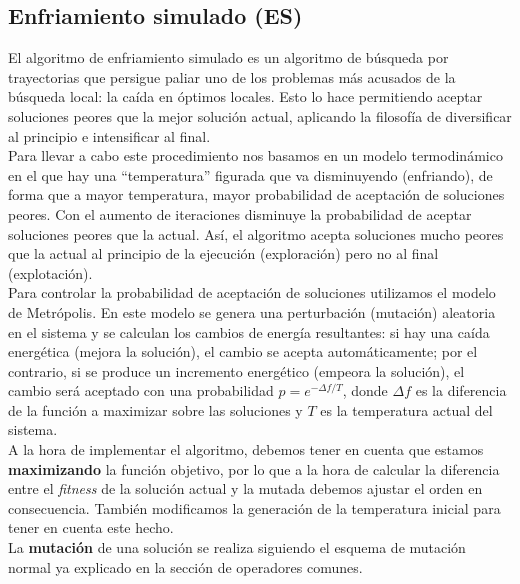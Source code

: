 \documentclass[12pt]{article}
\begin{document}
\subsection*{Enfriamiento simulado (ES)}
\label{es}

El algoritmo de enfriamiento simulado es un algoritmo de búsqueda por trayectorias que persigue paliar uno de los problemas más acusados de la búsqueda local: la caída en óptimos locales. Esto lo hace permitiendo aceptar soluciones peores que la mejor solución actual, aplicando la filosofía de diversificar al principio e intensificar al final.\\

Para llevar a cabo este procedimiento nos basamos en un modelo termodinámico en el que hay una ``temperatura'' figurada que va disminuyendo (enfriando), de forma que a mayor temperatura, mayor probabilidad de aceptación de soluciones peores. Con el aumento de iteraciones disminuye la probabilidad de aceptar soluciones peores que la actual. Así, el algoritmo acepta soluciones mucho peores que la actual al principio de la ejecución (exploración) pero no al final (explotación).\\

Para controlar la probabilidad de aceptación de soluciones utilizamos el modelo de Metrópolis. En este modelo se genera una perturbación (mutación) aleatoria en el sistema y se calculan los cambios de energía resultantes: si hay una caída energética (mejora la solución), el cambio se acepta automáticamente; por el contrario,
si se produce un incremento energético (empeora la solución), el cambio será aceptado con una probabilidad $p = e^{- \Delta f / T}$, donde $\Delta f$ es la diferencia de la función a maximizar sobre las soluciones y $T$ es la temperatura actual del sistema.\\

A la hora de implementar el algoritmo, debemos tener en cuenta que estamos \textbf{maximizando} la función objetivo, por lo que a la hora de calcular la diferencia entre el \textit{fitness} de la solución actual y la mutada debemos ajustar el orden en consecuencia. También modificamos la generación de la temperatura inicial para tener en cuenta este hecho.\\

La \textbf{mutación} de una solución se realiza siguiendo el esquema de mutación normal ya explicado en la sección de operadores comunes.\\
\end{document}
